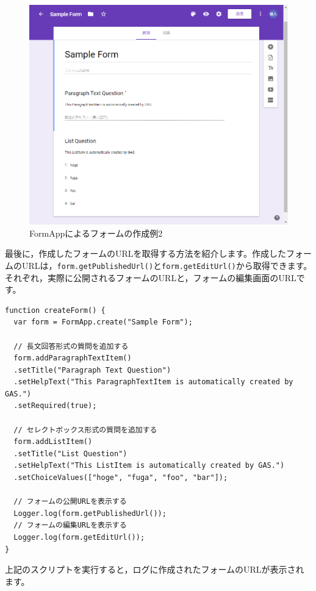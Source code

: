 \documentclass[uplatex,a4j]{jsarticle}
\begin{document}
\begin{figure}[H]
 \centering
 \includegraphics[keepaspectratio, scale=0.5]{images/form_sample3.png}
 \caption{FormAppによるフォームの作成例2}
 \label{fig:form_sample3}
\end{figure}

最後に，作成したフォームのURLを取得する方法を紹介します。作成したフォームのURLは，\verb|form.getPublishedUrl()|と\verb|form.getEditUrl()|から取得できます。それぞれ，実際に公開されるフォームのURLと，フォームの編集画面のURLです。

\begin{lstlisting}[basicstyle=\ttfamily\footnotesize,frame=single,caption=FormApp sample 6]
function createForm() {
  var form = FormApp.create("Sample Form");
  
  // 長文回答形式の質問を追加する
  form.addParagraphTextItem()
  .setTitle("Paragraph Text Question")
  .setHelpText("This ParagraphTextItem is automatically created by GAS.")
  .setRequired(true);
  
  // セレクトボックス形式の質問を追加する
  form.addListItem()
  .setTitle("List Question")
  .setHelpText("This ListItem is automatically created by GAS.")
  .setChoiceValues(["hoge", "fuga", "foo", "bar"]);
  
  // フォームの公開URLを表示する
  Logger.log(form.getPublishedUrl());
  // フォームの編集URLを表示する
  Logger.log(form.getEditUrl());
}
\end{lstlisting}

上記のスクリプトを実行すると，ログに作成されたフォームのURLが表示されます。
\end{document}
